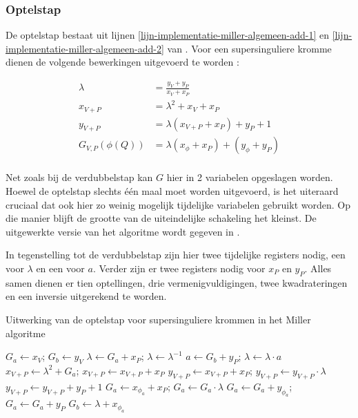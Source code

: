 \subsubsection{Optelstap}

De optelstap bestaat uit lijnen \ref{lijn-implementatie-miller-algemeen-add-1} en \ref{lijn-implementatie-miller-algemeen-add-2} van . Voor een supersinguliere kromme dienen de volgende bewerkingen uitgevoerd te worden \cite{bertoni, hankerson-book}:

\[\begin{aligned}
	\lambda &= \frac{y_V + y_P}{x_V + x_P}\\
	x_{V + P} &= \lambda ^2 + x_V + x_P\\
	y_{V + P} &= \lambda (x_{V + P} + x_P) + y_P + 1\\
	G_{V,P}(\phi(Q)) &= \lambda (x_{\phi} + x_P) + (y_{\phi} + y_P)\\
\end{aligned}\]

Net zoals bij de verdubbelstap kan $G$ hier in 2 variabelen opgeslagen worden. Hoewel de optelstap slechts \'e\'en maal moet worden uitgevoerd, is het uiteraard cruciaal dat ook hier zo weinig mogelijk tijdelijke variabelen gebruikt worden. Op die manier blijft de grootte van de uiteindelijke schakeling het kleinst. De uitgewerkte versie van het algoritme wordt gegeven in .

In tegenstelling tot de verdubbelstap zijn hier twee tijdelijke registers nodig, een voor $\lambda$ en een voor $a$. Verder zijn er twee registers nodig voor $x_P$ en $y_P$. Alles samen dienen er tien optellingen, drie vermenigvuldigingen, twee kwadrateringen en een inversie uitgerekend te worden.

\begin{algorithm}[h]
	\caption{Uitwerking van de optelstap voor supersinguliere krommen in het Miller algoritme}
	\label{algoritme-implementatie-miller-add-detail}
	$G_a \leftarrow x_V$; $G_b \leftarrow y_V$\;
	$\lambda \leftarrow G_a + x_P$; $\lambda \leftarrow \lambda^{-1}$\;
	$a \leftarrow G_b + y_P$; $\lambda \leftarrow \lambda \cdot a$\;
	$x_{V + P} \leftarrow \lambda ^2 + G_a$; $x_{V + P} \leftarrow x_{V + P} + x_P$\;
	$y_{V + P} \leftarrow x_{V + P} + x_P$; $y_{V + P} \leftarrow y_{V + P} \cdot \lambda$\;
	$y_{V + P} \leftarrow y_{V + P} + y_P + 1$\;
	$G_a \leftarrow x_{\phi_a} + x_P$; $G_a \leftarrow G_a \cdot \lambda$\;
	$G_a \leftarrow G_a + y_{\phi_a}$; $G_a \leftarrow G_a + y_P$\;
	$G_b \leftarrow \lambda + x_{\phi_a}$\;
\end{algorithm}

